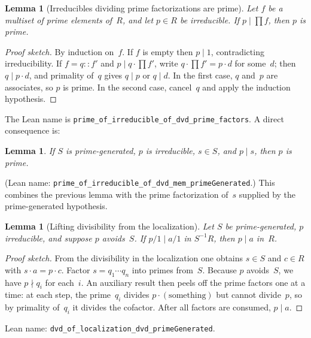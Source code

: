 \documentclass[11pt]{article}
\theoremstyle{plain}
\newtheorem{lemma}[theorem]{Lemma}
\theoremstyle{definition}
\theoremstyle{remark}
\newcommand{\li}[1]{\texorpdfstring{\texttt{#1}}{#1}}
\begin{document}
\begin{lemma}[Irreducibles dividing prime factorizations are prime]%
\label{lem:irred-dvd-primes}
Let $f$ be a multiset of prime elements of~$R$, and let $p\in R$ be
irreducible.  If $p\mid\prod f$, then $p$ is prime.
\end{lemma}

\begin{proof}[Proof sketch]
By induction on~$f$.  If $f$ is empty then $p\mid 1$, contradicting
irreducibility.  If $f=q\mathbin{::}f'$ and $p\mid q\cdot\prod f'$, write
$q\cdot\prod f' = p\cdot d$ for some~$d$; then $q\mid p\cdot d$, and primality
of~$q$ gives $q\mid p$ or $q\mid d$.  In the first case, $q$ and~$p$ are
associates, so $p$ is prime.  In the second case, cancel~$q$ and apply the
induction hypothesis.
\end{proof}

\noindent
The Lean name is
\li{prime\_of\_irreducible\_of\_dvd\_prime\_factors}.  A direct consequence is:

\begin{lemma}\label{lem:irred-dvd-mem}
If $S$ is prime-generated, $p$ is irreducible, $s\in S$, and $p\mid s$, then
$p$ is prime.
\end{lemma}

\noindent
(Lean name:
\li{prime\_of\_irreducible\_of\_dvd\_mem\_primeGenerated}.)
This combines the previous lemma with the prime factorization of~$s$ supplied
by the prime-generated hypothesis.

\medskip

\begin{lemma}[Lifting divisibility from the localization]%
\label{lem:lift-dvd}
Let $S$ be prime-generated, $p$ irreducible, and suppose $p$ avoids~$S$.  If
$p/1\mid a/1$ in $S^{-1}R$, then $p\mid a$ in~$R$.
\end{lemma}

\begin{proof}[Proof sketch]
From the divisibility in the localization one obtains $s\in S$ and $c\in R$
with $s\cdot a = p\cdot c$.  Factor $s=q_1\cdots q_n$ into primes from~$S$.
Because $p$ avoids~$S$, we have $p\nmid q_i$ for each~$i$.  An auxiliary
result then peels off the prime factors one at a time: at each step, the
prime~$q_i$ divides $p\cdot(\text{something})$ but cannot divide~$p$, so by
primality of~$q_i$ it divides the cofactor.  After all factors are consumed,
$p\mid a$.
\end{proof}

\noindent
Lean name: \li{dvd\_of\_localization\_dvd\_primeGenerated}.
\end{document}
